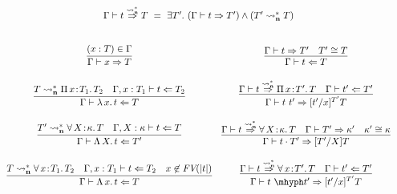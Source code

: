 \documentclass{article}
\newcommand{\abs}[4]{{#1}\, #2\! : \! #3.\, #4}
\newcommand{\absu}[3]{{#1}\, #2.\, #3}
\newcommand{\leadstocs}[0]{\ensuremath{\leadsto_{\mathbf{n}}^*}}
\newcommand{\tpcheck}[0]{\Leftarrow}
\newcommand{\tpsynth}[0]{\Rightarrow}
\newcommand{\tpsynthleads}[0]{\ensuremath{\overset{\leadstocs}{\Rightarrow}}}
\begin{document}
\begin{figure}
  \[
    \begin{array}{c}
      \Gamma \vdash t \tpsynthleads T\ =\ \exists T'.\ (\Gamma
      \vdash t \tpsynth T') \land (T' \leadstocs T)
      \\ \\ \\
  \begin{array}{cc}
    \infer{\Gamma\vdash x\tpsynth T}{(x : T)\in\Gamma} &
    \infer{\Gamma\vdash t\tpcheck T}{\Gamma\vdash t\tpsynth T' & T' \cong T} \\ \\
    \infer{\Gamma\vdash \absu{\lambda}{x}{t} \tpcheck T}{T \leadstocs \abs{\Pi}{x}{T_1}{T_2} & \Gamma,x:T_1\vdash t\tpcheck T_2} &
    \infer{\Gamma\vdash t\ t' \tpsynth [t'/x]^{T'}T}{\Gamma\vdash t \tpsynthleads \abs{\Pi}{x}{T'}{T} & \Gamma\vdash t' \tpcheck T'} \\ \\

    \infer{\Gamma\vdash \absu{\Lambda}{X}{t} \tpcheck T'}
          {T' \leadstocs \abs{\forall}{X}{\kappa}{T} & \Gamma,X:\kappa\vdash t \tpcheck T} &
    \infer{\Gamma\vdash t \cdot T' \tpsynth [T'/X]T}
          {\Gamma\vdash t \tpsynthleads \abs{\forall}{X}{\kappa}{T} & \Gamma\vdash T' \tpsynth \kappa' & \kappa'\cong\kappa} \\ \\

    \infer{\Gamma\vdash \absu{\Lambda}{x}{t} \tpcheck T}
          {T \leadstocs \abs{\forall}{x}{T_1}{T_2} & \Gamma,x:T_1\vdash t \tpcheck T_2 & x\not\in\textit{FV}(|t|)} &
    \infer{\Gamma\vdash t\ \mhyph t' \tpsynth [t'/x]^{T'}T}{\Gamma\vdash t \tpsynthleads \abs{\forall}{x}{T'}{T} & \Gamma\vdash t' \tpcheck T'} \\ \\


\end{array}
\end{array}\]
\end{figure}
\end{document}
